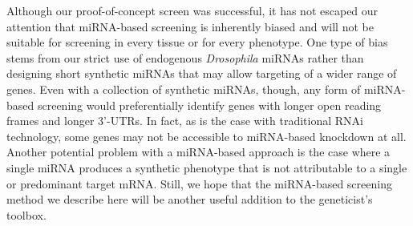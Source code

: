 Although our proof-of-concept screen was successful, it has not escaped our attention that miRNA-based screening is inherently biased and will not be suitable for screening in every tissue or for every phenotype.
One type of bias stems from our strict use of endogenous \emph{Drosophila} miRNAs rather than designing short synthetic miRNAs that may allow targeting of a wider range of genes.
Even with a collection of synthetic miRNAs, though, any form of miRNA-based screening would preferentially identify genes with longer open reading frames and longer 3'-UTRs.
In fact, as is the case with traditional RNAi technology, some genes may not be accessible to miRNA-based knockdown at all.
Another potential problem with a miRNA-based approach is the case where a single miRNA produces a synthetic phenotype that is not attributable to a single or predominant target mRNA.
Still, we hope that the miRNA-based screening method we describe here will be another useful addition to the geneticist's toolbox.